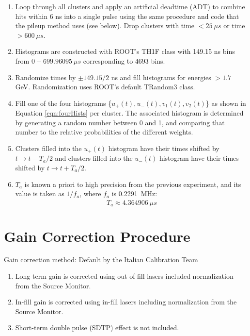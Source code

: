\begin{enumerate}
	\item{Loop through all clusters and apply an artificial deadtime (ADT) to combine hits within 6 ns into a single pulse using the same procedure and code that the pileup method uses (see below). Drop clusters with time $< \SI{25}{\mu s}$ or time $> \SI{600}{\mu s}$.}
	\item{Histograms are constructed with ROOT's TH1F class with 149.15 ns bins from $0 - \SI{699.96095}{\mu s}$ corresponding to 4693 bins.}
	\item{Randomize times by $\pm 149.15/2$ ns and fill histograms for energies $> 1.7$ GeV. Randomization uses ROOT's default TRandom3 class.}
	\item{Fill one of the four histograms \{$u_{+}(t), u_{-}(t), v_{1}(t), v_{2}(t)$\} as shown in Equation \ref{eqn:fourHists} per cluster. The associated histogram is determined by generating a random number between 0 and 1, and comparing that number to the relative probabilities of the different weights.}
	\item{Clusters filled into the $u_{+}(t)$ histogram have their times shifted by $t \rightarrow t - T_{a}/2$ and clusters filled into the $u_{-}(t)$ histogram have their times shifted by $t \rightarrow t + T_{a}/2$.}
	\item{$T_{a}$ is known a priori to high precision from the previous experiment, and its value is taken as $1/f_{a}$, where $f_{a}$ is \SI{0.2291}{MHz}:
		\begin{align}
			T_{a} \approx \SI{4.364906}{\mu s}
		\label{eq:Ta}
		\end{align}}
\end{enumerate}


\section{Gain Correction Procedure}

Gain correction method: Default by the Italian Calibration Team

\begin{enumerate}
	\item{Long term gain is corrected using out-of-fill lasers included normalization from the Source Monitor.}
	\item{In-fill gain is corrected using in-fill lasers including normalization from the Source Monitor.}
	\item{Short-term double pulse (SDTP) effect is not included.}
\end{enumerate}


